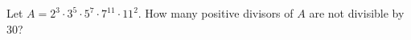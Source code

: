 Let $A=2^{3}\cdot3^{5}\cdot5^{7}\cdot7^{11}\cdot11^{2}$. How many positive divisors of $A$ are not divisible by $30$?
